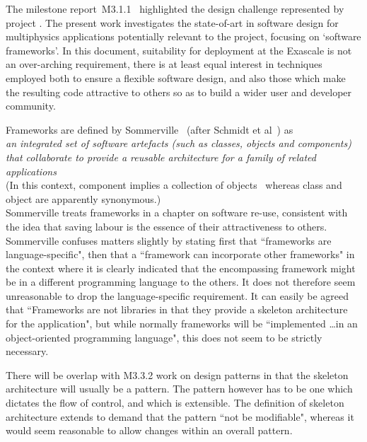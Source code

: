 The milestone report~M3.1.1~\cite{y1re311} highlighted the design challenge 
represented by project \nep. The present work investigates the state-of-art
in software design for multiphysics applications potentially relevant to
the project, focusing on `software frameworks'. In this document, suitability
for deployment at the Exascale is not an over-arching requirement, there is at least
equal interest in techniques employed both to ensure a flexible software
design, and also those which make the resulting code attractive to others so as to build
a wider user and developer community.


Frameworks are defined by Sommerville~\cite[\S\,15.2]{sommerville} (after
Schmidt et al~\cite{Sc04Leve}) as\\
\emph{an integrated set of software artefacts (such as classes, objects and components) that
collaborate to provide a reusable architecture for a family of related applications}\\
(In this context, component implies a collection of objects~\cite[\S\,2.1.3]{sommerville}
whereas class and object are apparently synonymous.)\\
Sommerville treats frameworks in a chapter on software re-use, consistent
with the idea that saving labour is the essence of their attractiveness to others.
Sommerville confuses matters slightly by stating first that ``frameworks are
language-specific", then that a ``framework can incorporate other frameworks"
in the context where it is clearly indicated that the encompassing
framework might be in a different programming language to the others. 
It does not therefore seem unreasonable to drop the language-specific requirement.
It can easily be agreed~~\cite[\S\,15.2]{sommerville} that ``Frameworks are not libraries
in that they provide a skeleton architecture for the application", but while
normally frameworks will be ``implemented \ldots in an object-oriented programming language",
this does not seem to be strictly necessary.

There will be overlap with M3.3.2 work on design patterns in that the skeleton
architecture will usually be a pattern. The pattern however has to be one which
dictates the flow of control, and which is extensible. The definition of skeleton
architecture extends to demand that the pattern ``not be modifiable", whereas it
would seem reasonable to allow changes within an overall pattern.

